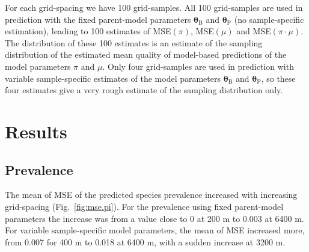 \documentclass[review]{elsarticle}
\begin{document}
For each grid-spacing we have 100 grid-samples. All 100 grid-samples are used in prediction with the fixed parent-model parameters $\boldsymbol{\theta}_{\mathrm{B}}$ and $\boldsymbol{\theta}_{\mathrm{P}}$ (no sample-specific estimation), leading to 100 estimates of MSE$(\pi)$, MSE$(\mu)$ and MSE$(\pi \cdot \mu)$. The distribution of these 100 estimates is an estimate of the sampling distribution of the estimated mean quality of model-based predictions of the model parameters $\pi$ and $\mu$. Only four grid-samples are used in prediction with variable sample-specific estimates of the model parameters $\boldsymbol{\theta}_{\mathrm{B}}$ and $\boldsymbol{\theta}_{\mathrm{P}}$, so these four estimates give a very rough estimate of the sampling distribution only.

\section{Results} \label{sec:results}

\subsection{Prevalence}
The mean of MSE of the predicted species prevalence increased with increasing grid-spacing (Fig.~\ref{fig:mse.pi}).
For the prevalence using fixed parent-model parameters the increase was from a value close to 0 at 200 m to 0.003 at 6400 m.
For variable sample-specific model parameters, the mean of MSE increased more, from 0.007 for 400 m to 0.018 at 6400 m, with a sudden increase at 3200 m.
\end{document}

